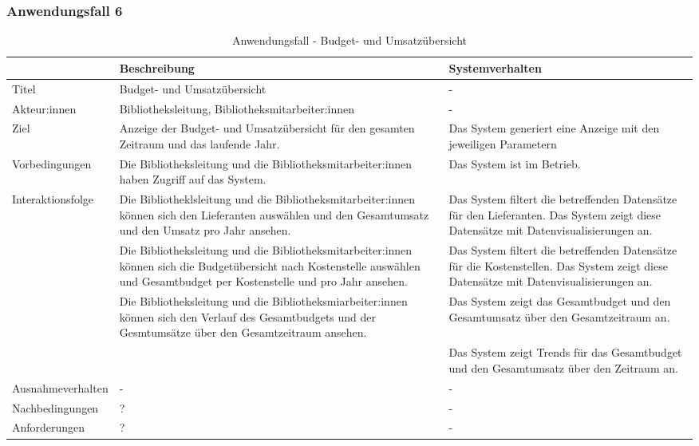 \subsubsection{Anwendungsfall 6}

\begingroup
\setlength{\tabcolsep}{10pt} %
\renewcommand{\arraystretch}{1.25} 
\begin{table}[H]
    \centering
    \begin{adjustbox}{max width=\textwidth}
    \begin{tabular}{lp{7.0cm}p{7.0cm}}
       \toprule
       \textbf{}          & \textbf{Beschreibung} &\textbf{Systemverhalten}\\
       \midrule
        Titel                            &Budget- und Umsatzübersicht& -\\
        Akteur:innen                     &Bibliotheksleitung, Bibliotheksmitarbeiter:innen& -\\
        Ziel                             &Anzeige der Budget- und Umsatzübersicht für den gesamten Zeitraum und das laufende Jahr.& Das System generiert eine Anzeige mit den jeweiligen Parametern\\
        Vorbedingungen                   &Die Bibliotheksleitung und die Bibliotheksmitarbeiter:innen haben Zugriff auf das System.& Das System ist im Betrieb.\\
        Interaktionsfolge                &Die Bibliotheklsleitung und die Bibliotheksmitarbeiter:innen können sich den Lieferanten auswählen und den Gesamtumsatz und den Umsatz pro Jahr ansehen.& Das System filtert die betreffenden Datensätze für den Lieferanten. Das System zeigt diese Datensätze mit Datenvisualisierungen an.\\
                                         &Die Bibliotheksleitung und die Bibliotheksmitarbeiter:innen können sich die Budgetübersicht nach Kostenstelle auswählen und Gesamtbudget per Kostenstelle und pro Jahr ansehen. &Das System filtert die betreffenden Datensätze für die Kostenstellen. Das System zeigt diese Datensätze mit Datenvisualisierungen an.\\
                                         &Die Bibliotheksleitung und die Bibliotheksmiarbeiter:innen können sich den Verlauf des Gesamtbudgets und der Gesmtumsätze über den Gesamtzeitraum ansehen. &Das System zeigt das Gesamtbudget und den Gesamtumsatz über den Gesamtzeitraum an.\\
                                         & &Das System zeigt Trends für das Gesamtbudget und den Gesamtumsatz über den Zeitraum an.\\
        Ausnahmeverhalten               &- & -\\
        Nachbedingungen                 &?& -\\

        Anforderungen                   &?& -\\
        \bottomrule
    \end{tabular}
    \end{adjustbox}
    \caption{%
    Anwendungsfall - Budget- und Umsatzübersicht   }
    \label{tab:AF_BudgetUmsatz}
    \end{table}
\endgroup


